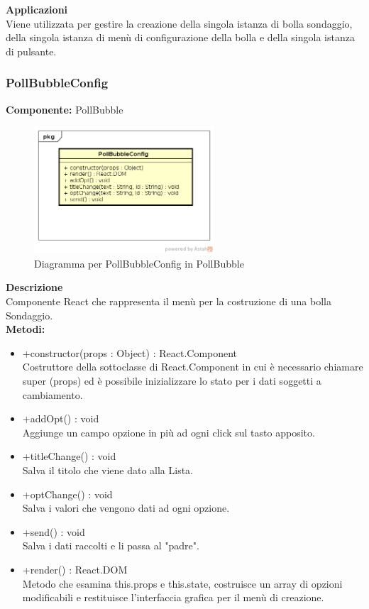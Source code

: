 \textbf{Applicazioni}\\
Viene utilizzata per gestire la creazione della singola istanza di bolla sondaggio, della singola istanza di menù di configurazione della bolla e della singola istanza di pulsante. 


\clearpage

\subsubsection{PollBubbleConfig}
\textbf{Componente:}  PollBubble\\
   \FloatBarrier
   \begin{figure}[ht]
   \centering
   \includegraphics[width=0.6\textwidth]{img/single-PollBubbleConfig.png}
   \caption{{Diagramma per PollBubbleConfig in PollBubble}}
\end{figure}
\FloatBarrier
\textbf{Descrizione}\\
Componente React che rappresenta il menù per la costruzione di una bolla Sondaggio.
\\
\textbf{Metodi:} 
\begin{itemize}
\item +constructor(props : Object) : React.Component 
\\
Costruttore della sottoclasse di React.Component in cui è necessario chiamare super (props) ed è possibile inizializzare lo stato per i dati soggetti a cambiamento.

\item +addOpt() : void 
\\
Aggiunge un campo opzione in più ad ogni click sul tasto apposito.

\item +titleChange() : void 
\\
Salva il titolo che viene dato alla Lista.

\item +optChange() : void 
\\
Salva i valori che vengono dati ad ogni opzione.

\item +send() : void 
\\
Salva i dati raccolti e li passa al "padre".

\item +render() : React.DOM \\
Metodo che esamina this.props e this.state, costruisce un array di opzioni modificabili e restituisce l'interfaccia grafica per il menù di creazione.
\end{itemize}

